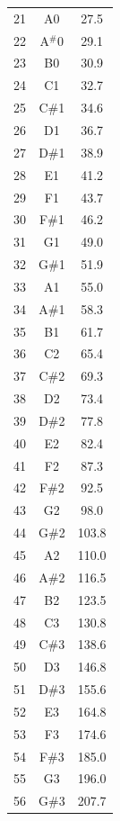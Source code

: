 \documentclass[10pt]{book}
\begin{document}
\begin{CJK}{UTF8}{gkai}
\footnotesize
\twocolumn
\begin{spacing}{0.99}
\begin{supertabular}{ccc}
\label{MIDI}
21  & A0  &  27.5 \\
22  & A$^\#$0 &  29.1 \\
23  & B0  &  30.9 \\
24  & C1  &  32.7 \\
25  & C\#1 &  34.6 \\
26  & D1  &  36.7 \\
27  & D\#1 &  38.9 \\
28  & E1  &  41.2 \\
29  & F1  &  43.7 \\
30  & F\#1 &  46.2 \\
31  & G1  &  49.0 \\
32  & G\#1 &  51.9  \\
33  & A1  &  55.0  \\
34  & A\#1 &  58.3  \\
35  & B1  &  61.7  \\
36  & C2  &  65.4  \\
37  & C\#2 &  69.3  \\
38  & D2  &  73.4  \\
39  & D\#2 &  77.8  \\
40  & E2  &  82.4  \\
41  & F2  &  87.3  \\
42  & F\#2 &  92.5  \\
43  & G2  &  98.0  \\
44  & G\#2 & 103.8  \\
45  & A2  & 110.0  \\
46  & A\#2 & 116.5  \\
47  & B2  & 123.5  \\
48  & C3  & 130.8  \\
49  & C\#3 & 138.6  \\
50  & D3  & 146.8  \\
51  & D\#3 & 155.6  \\
52  & E3  & 164.8  \\
53  & F3  & 174.6  \\
54  & F\#3 & 185.0  \\
55  & G3  & 196.0  \\
56  & G\#3 & 207.7  \\

\end{supertabular}
\end{spacing}
\end{CJK}
\end{document}
